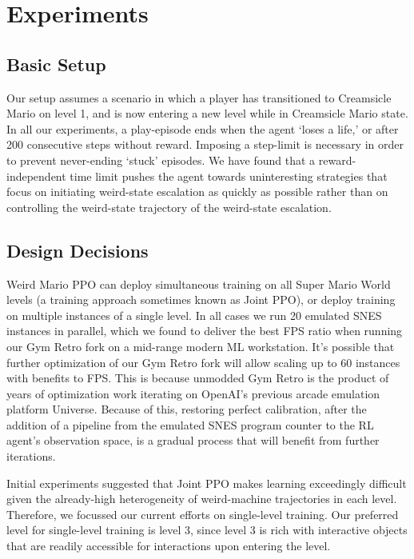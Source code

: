 \documentclass[]{article}
\begin{document}
\hypertarget{experiments}{%
\section{Experiments}\label{experiments}}

\hypertarget{basic-setup}{%
\subsection{Basic Setup}\label{basic-setup}}

Our setup assumes a scenario in which a player has transitioned to
Creamsicle Mario on level 1, and is now entering a new level while in
Creamsicle Mario state. In all our experiments, a play-episode ends when
the agent `loses a life,' or after 200 consecutive steps without reward.
Imposing a step-limit is necessary in order to prevent never-ending
`stuck' episodes. We have found that a reward-independent time limit
pushes the agent towards uninteresting strategies that focus on
initiating weird-state escalation as quickly as possible rather than on
controlling the weird-state trajectory of the weird-state escalation.

\hypertarget{design-decisions}{%
\subsection{Design Decisions}\label{design-decisions}}

Weird Mario PPO can deploy simultaneous training on all Super Mario
World levels (a training approach sometimes known as Joint PPO), or
deploy training on multiple instances of a single level. In all cases we
run 20 emulated SNES instances in parallel, which we found to deliver
the best FPS ratio when running our Gym Retro fork on a mid-range modern
ML workstation. It's possible that further optimization of our Gym Retro
fork will allow scaling up to 60 instances with benefits to FPS. This is
because unmodded Gym Retro is the product of years of optimization work
iterating on OpenAI's previous arcade emulation platform Universe.
Because of this, restoring perfect calibration, after the addition of a
pipeline from the emulated SNES program counter to the RL agent's
observation space, is a gradual process that will benefit from further
iterations.

Initial experiments suggested that Joint PPO makes learning exceedingly
difficult given the already-high heterogeneity of weird-machine
trajectories in each level. Therefore, we focussed our current efforts
on single-level training. Our preferred level for single-level training
is level 3, since level 3 is rich with interactive objects that are
readily accessible for interactions upon entering the level.
\end{document}
